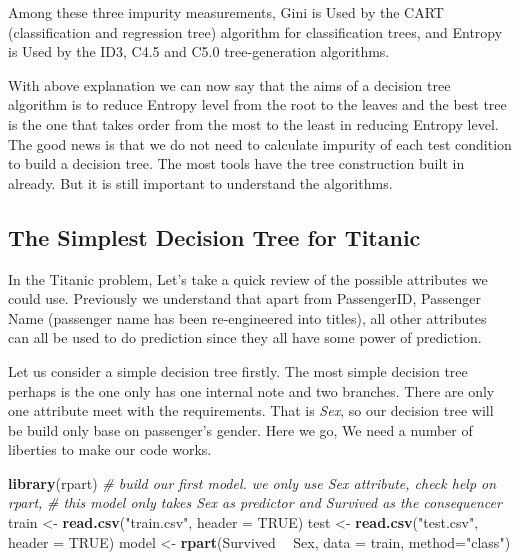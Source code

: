 \documentclass[
]{book}
\newenvironment{Shaded}{\begin{snugshade}}{\end{snugshade}}
\newcommand{\CommentTok}[1]{\textcolor[rgb]{0.56,0.35,0.01}{\textit{#1}}}
\newcommand{\DataTypeTok}[1]{\textcolor[rgb]{0.13,0.29,0.53}{#1}}
\newcommand{\KeywordTok}[1]{\textcolor[rgb]{0.13,0.29,0.53}{\textbf{#1}}}
\newcommand{\NormalTok}[1]{#1}
\newcommand{\OperatorTok}[1]{\textcolor[rgb]{0.81,0.36,0.00}{\textbf{#1}}}
\newcommand{\OtherTok}[1]{\textcolor[rgb]{0.56,0.35,0.01}{#1}}
\newcommand{\StringTok}[1]{\textcolor[rgb]{0.31,0.60,0.02}{#1}}
\begin{document}
Among these three impurity measurements, Gini is Used by the CART (classification and regression tree) algorithm for classification trees, and Entropy is Used by the ID3, C4.5 and C5.0 tree-generation algorithms.

With above explanation we can now say that the aims of a decision tree algorithm is to reduce Entropy level from the root to the leaves and the best tree is the one that takes order from the most to the least in reducing Entropy level. The good news is that we do not need to calculate impurity of each test condition to build a decision tree. The most tools have the tree construction built in already. But it is still important to understand the algorithms.

\hypertarget{the-simplest-decision-tree-for-titanic}{%
\subsection{The Simplest Decision Tree for Titanic}\label{the-simplest-decision-tree-for-titanic}}

In the Titanic problem, Let's take a quick review of the possible attributes we could use. Previously we understand that apart from PassengerID, Passenger Name (passenger name has been re-engineered into titles), all other attributes can all be used to do prediction since they all have some power of prediction.

Let us consider a simple decision tree firstly. The most simple decision tree perhaps is the one only has one internal note and two branches. There are only one attribute meet with the requirements. That is \emph{Sex}, so our decision tree will be build only base on passenger's gender. Here we go, We need a number of liberties to make our code works.

\begin{Shaded}
\begin{Highlighting}[]
\KeywordTok{library}\NormalTok{(rpart)}
\CommentTok{# build our first model. we only use Sex attribute, check help on rpart, }
\CommentTok{# this model only takes Sex as predictor and Survived as the consequencer}
\NormalTok{train <-}\StringTok{ }\KeywordTok{read.csv}\NormalTok{(}\StringTok{"train.csv"}\NormalTok{, }\DataTypeTok{header =} \OtherTok{TRUE}\NormalTok{)}
\NormalTok{test <-}\StringTok{ }\KeywordTok{read.csv}\NormalTok{(}\StringTok{"test.csv"}\NormalTok{, }\DataTypeTok{header =} \OtherTok{TRUE}\NormalTok{)}
\NormalTok{model <-}\StringTok{ }\KeywordTok{rpart}\NormalTok{(Survived }\OperatorTok{~}\StringTok{ }\NormalTok{Sex, }\DataTypeTok{data =}\NormalTok{ train,}
              \DataTypeTok{method=}\StringTok{"class"}\NormalTok{)}
\end{Highlighting}
\end{Shaded}
\end{document}
